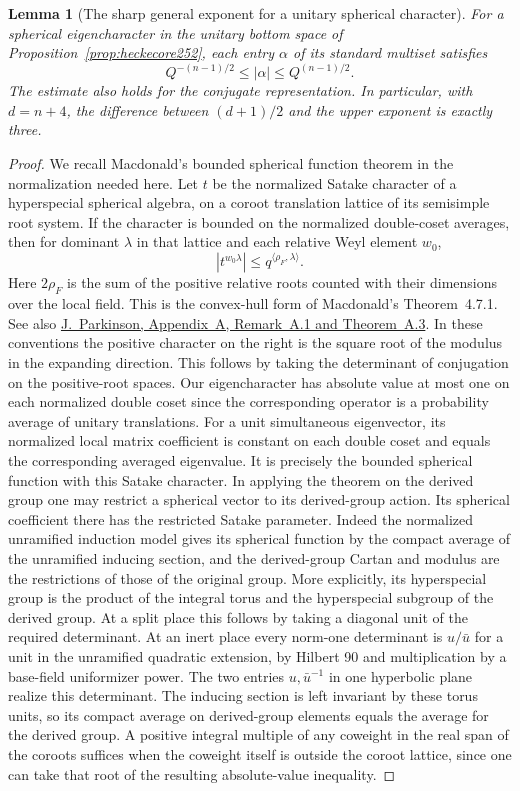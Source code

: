 \documentclass[a4paper,11pt]{article}
\newtheorem{lemma}[proposition]{Lemma}
\theoremstyle{definition}
\theoremstyle{remark}
\numberwithin{equation}{section}
\begin{document}
\begin{lemma}[The sharp general exponent for a unitary spherical character]
\label{lem:sphericalcore252}
For a spherical eigencharacter in the unitary bottom space of
Proposition~\ref{prop:heckecore252}, each entry \(\alpha\) of its
standard multiset satisfies
\[
                 Q^{-(n-1)/2}\le |\alpha|\le Q^{(n-1)/2} .
\]
The estimate also holds for the conjugate representation. In
particular, with \(d=n+4\), the difference between \((d+1)/2\)
and the upper exponent is exactly three.
\end{lemma}
\begin{proof}
We recall Macdonald's bounded spherical function theorem in the
normalization needed here. Let \(t\) be the normalized Satake character
of a hyperspecial spherical algebra, on a coroot translation lattice
of its semisimple root system. If the character is bounded on the
normalized double-coset averages, then for dominant \(\lambda\) in
that lattice and each relative Weyl element \(w_0\),
\[
           |t^{w_0\lambda}|\le q^{\langle\rho_F,\lambda\rangle} .
\]
Here \(2\rho_F\) is the sum of the positive relative roots counted
with their dimensions over the local field. This is the convex-hull
form of Macdonald's Theorem~4.7.1. See also
\href{https://www.maths.usyd.edu.au/u/pubs/publist/preprints/2005/parkinson-36.pdf}{J.~Parkinson,
Appendix~A, Remark~A.1 and Theorem~A.3}. In these conventions the
positive character on the right is the square root of the modulus
in the expanding direction. This follows by taking the determinant
of conjugation on the positive-root spaces. Our eigencharacter has
absolute value at most one on each normalized double coset since the
corresponding operator is a probability average of unitary translations.
For a unit simultaneous eigenvector, its normalized local matrix
coefficient is constant on each double coset and equals the corresponding
averaged eigenvalue. It is precisely the bounded spherical function
with this Satake character.
In applying the theorem on the derived group one may restrict a
spherical vector to its derived-group action. Its spherical
coefficient there has the restricted Satake parameter. Indeed the
normalized unramified induction model gives its spherical function
by the compact average of the unramified inducing section, and the
derived-group Cartan and modulus are the restrictions of those of the
original group. More explicitly, its hyperspecial group is the product
of the integral torus and the hyperspecial subgroup of the derived
group. At a split place this follows by taking a diagonal unit of the
required determinant. At an inert place every norm-one determinant is
\(u/\bar u\) for a unit in the unramified quadratic extension, by
Hilbert 90 and multiplication by a base-field uniformizer power. The
two entries \(u,\bar u^{-1}\) in one hyperbolic plane realize this
determinant. The inducing section is left invariant by these torus
units, so its compact average on derived-group elements equals the
average for the derived group. A positive integral
multiple of any coweight in the real span of the coroots suffices
when the coweight itself is outside the coroot lattice, since one can
take that root of the resulting absolute-value inequality.


\end{proof}
\end{document}
